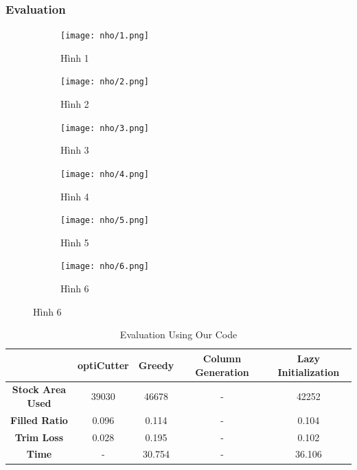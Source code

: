 \documentclass[a4paper]{article}
\begin{document}
\subsubsection*{Evaluation}
\begin{figure}[H] %
  \centering
  
  \begin{subfigure}[b]{0.48\textwidth}
    \centering
    \texttt{[image: nho/1.png]}
    \caption{Hình 1}
    \label{fig:1}
  \end{subfigure}
  \hfill
  \begin{subfigure}[b]{0.48\textwidth}
    \centering
    \texttt{[image: nho/2.png]}
    \caption{Hình 2}
    \label{fig:2}
  \end{subfigure}
  
  \vspace{0.3cm} %
  
  \begin{subfigure}[b]{0.48\textwidth}
    \centering
    \texttt{[image: nho/3.png]}
    \caption{Hình 3}
    \label{fig:3}
  \end{subfigure}
  \hfill
  \begin{subfigure}[b]{0.48\textwidth}
    \centering
    \texttt{[image: nho/4.png]}
    \caption{Hình 4}
    \label{fig:4}
  \end{subfigure}
  
  \vspace{0.3cm} %
  
  \begin{subfigure}[b]{0.48\textwidth}
    \centering
    \texttt{[image: nho/5.png]}
    \caption{Hình 5}
    \label{fig:5}
  \end{subfigure}
  \hfill
  \begin{subfigure}[b]{0.48\textwidth}
    \centering
    \texttt{[image: nho/6.png]}
    \caption{Hình 6}
    \label{fig:6}
  \end{subfigure}
                                                           
  \label{fig:all_images}
\end{figure}
\begin{table}[H]
        \centering
        \caption{Evaluation Using Our Code}
        \begin{tabular}{|c|c|c|c|c|}
            \hline
            \textbf{} & \textbf{optiCutter} & \textbf{Greedy} & \textbf{Column Generation} & \textbf{Lazy Initialization} \\ \hline
             \textbf{Stock Area Used} & 39030 & 46678 & - & 42252 \\ \hline
            \textbf{Filled Ratio} & 0.096 & 0.114 & - & 0.104 \\ \hline
            \textbf{Trim Loss} & 0.028 & 0.195 & - & 0.102 \\ \hline
            \textbf{Time} & - & 30.754 & - & 36.106 \\ \hline
        \end{tabular}
    \end{table}
\end{document}
